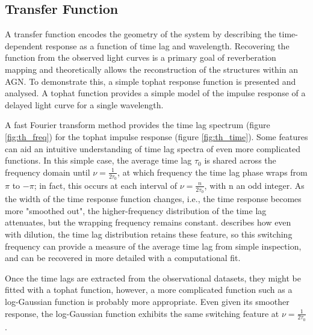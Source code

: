 \documentclass[11pt,letterpaper]{article}
\begin{document}
    \subsection{Transfer Function}
    \label{sec:xfer_func}

    A transfer function encodes the geometry of the system by describing the time-dependent response as a function of time lag and wavelength. Recovering the function from the observed light curves is a primary goal of reverberation mapping and theoretically allows the reconstruction of the structures within an AGN. To demonstrate this, a simple tophat response function is presented and analysed. A tophat function provides a simple model of the impulse response of a delayed light curve for a single wavelength.

    A fast Fourier transform method provides the time lag spectrum (figure \ref{fig:th_freq}) for the tophat impulse response (figure \ref{fig:th_time}). Some features can aid an intuitive understanding of time lag spectra of even more complicated functions. In this simple case, the average time lag $\tau_0$ is shared across the frequency domain until $\nu=\frac{1}{2\tau_0}$, at which frequency the time lag phase wraps from $\pi$ to $-\pi$; in fact, this occurs at each interval of $\nu=\frac{n}{2\tau_0}$, with n an odd integer. As the width of the time response function changes, i.e., the time response becomes more "smoothed out", the higher-frequency distribution of the time lag attenuates, but the wrapping frequency remains constant. \cite{2014A&ARv..22...72U} describes how even with dilution, the time lag distribution retains these feature, so this switching frequency can provide a measure of the average time lag from simple inspection, and can be recovered in more detailed with a computational fit.

    Once the time lags are extracted from the observational datasets, they might be fitted with a tophat function, however, a more complicated function such as a log-Gaussian function is probably more appropriate. Even given its smoother response, the log-Gaussian function exhibits the same switching feature at $\nu=\frac{1}{2\tau_0}$ \citep{2014A&ARv..22...72U}.
\end{document}
